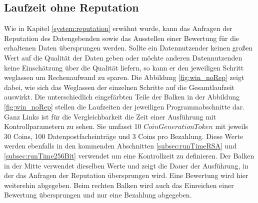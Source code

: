 \documentclass[
	fontsize=12pt,
	headings=small,
	parskip=half,           %
	bibliography=totoc,
	numbers=noenddot,       %
	open=any,               %
]{scrreprt}
\begin{document}
\subsection{Laufzeit ohne Reputation}
Wie in Kapitel \ref{system:reputation} erwähnt wurde, kann das Anfragen der Reputation des Datengebenden sowie das Ausstellen einer Bewertung für die erhaltenen Daten übersprungen werden. Sollte ein Datennutzender keinen großen Wert auf die Qualität der Daten geben oder möchte anderen Datennutzenden keine Einschätzung über die Qualität liefern, so kann er den jeweiligen Schritt weglassen um Rechenaufwand zu sparen. Die Abbildung \ref{fig:win_noRep} zeigt dabei, wie sich das Weglassen der einzelnen Schritte auf die Gesamtlaufzeit auswirkt.
Die unterschiedlich eingefärbten Teile der Balken in der Abbildung \ref{fig:win_noRep} stellen die Laufzeiten der jeweiligen Programmabschnitte dar. Ganz Links ist für die Vergleichbarkeit die Zeit einer Ausführung mit Kontrollparametern zu sehen. Sie umfasst 10 $CoinGenerationToken$ mit jeweils 30 Coins, 100 Datenpostfacheinträge und 3 Coins pro Bezahlung. Diese Werte werden ebenfalls in den kommenden Abschnitten \ref{subsec:runTimeRSA} und \ref{subsec:runTime256Bit} verwendet um eine Kontrollzeit zu definieren. Der Balken in der Mitte verwendet dieselben Werte und zeigt die Dauer der Ausführung, in der das Anfragen der Reputation übersprungen wird. Eine Bewertung wird hier weiterehin abgegeben. Beim rechten Balken wird auch das Einreichen einer Bewertung übersprungen und nur eine Bezahlung abgegeben.\\
\end{document}
